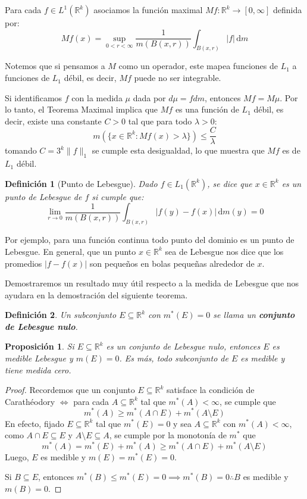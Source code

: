 \documentclass[12pt,a4paper]{article}
\theoremstyle{profesional}
\newtheorem{proposicion}{Proposición}[section]
\theoremstyle{definicion-style}
\newtheorem{definicion}{Definición}[section]
\newcommand{\R}{\mathbb{R}}
\begin{document}
Para cada \( f \in L^1(\R^k) \) asociamos la función maximal \( Mf: \R^k \to [0, \infty] \) definida por:\[
    Mf(x) = \sup_{0 < r < \infty} \frac{1}{m(B(x, r))} \int_{B(x, r)} |f| \, \mathrm{d} m
\]

Notemos que si pensamos a \( M \) como un operador, este mapea funciones de \( L_1 \) a funciones de \( L_1 \) débil, es decir, \( Mf \) puede no ser integrable.

Si identificamos \( f \) con la medida \( \mu \) dada por \( d \mu = f d m \), entonces \( Mf = M \mu \). Por lo tanto, el Teorema Maximal implica que \( Mf \) es una función
de \( L_1 \) débil, es decir, existe una constante \( C > 0 \) tal que para todo \( \lambda > 0 \):
\[
    m \left( \{ x \in \R^k : Mf(x) > \lambda \} \right) \leq \frac{C}{\lambda}
\]
tomando \( C = 3^k \|f\|_1 \) se cumple esta desigualdad, lo que muestra que \( Mf \) es de \( L_1 \) débil.

\begin{definicion}[Punto de Lebesgue]
    Dado \( f \in L_1(\R^k) \), se dice que \( x \in \R^k \) es un punto de Lebesgue de \( f \) si cumple que: \[
        \lim_{r \to 0} \frac{1}{m(B(x, r))} \int_{B(x, r)} |f(y) - f(x)| \, \mathrm{d} m(y) = 0
    \]
\end{definicion}

Por ejemplo, para una función continua todo punto del dominio es un punto de Lebesgue. En general, que un punto \( x \in \R^k \) sea de Lebesgue nos dice que los promedios
\( |f - f(x)| \) son pequeños en bolas pequeñas alrededor de \( x \).

Demostraremos un resultado muy útil respecto a la medida de Lebesgue que nos ayudara en la demostración del siguiente teorema.

\begin{definicion}
    Un subconjunto \( E \subseteq \R^k \) con \( m^*(E) = 0 \) se llama un \textbf{conjunto de Lebesgue nulo}.
\end{definicion}

\begin{proposicion}\label{proposicion:conjuntos-nulos}
    Si \( E \subseteq \R^k \) es un conjunto de Lebesgue nulo, entonces \( E \) es medible Lebesgue y \( m(E) = 0 \). Es más, todo subconjunto de \( E \) es medible y tiene medida cero.
\end{proposicion}
\begin{proof}
    Recordemos que un conjunto \( E \subseteq \R^k \) satisface la condición de Carathéodory \( \iff \) para cada \( A \subseteq \R^k \) tal que \( m^*(A) < \infty \), se cumple que \[
        m^*(A) \geq m^*(A \cap E) + m^*(A \setminus E)
    \]
    En efecto, fijado \( E \subseteq \R^k \) tal que \( m^*(E) = 0 \) y sea \( A \subseteq \R^k \) con \( m^*(A) < \infty \),
    como \( A \cap E \subseteq E \) y \( A \setminus E \subseteq A \), se cumple por la monotonía de \( m^* \) que \[
        m^*(A) = m^*(E) + m^*(A) \geq m^*(A \cap E) + m^*(A \setminus E)
    \]
    Luego, \( E \) es medible y \( m(E) = m^*(E) = 0 \).

    Si \( B \subseteq E \), entonces \( m^*(B) \leq m^*(E) = 0 \implies m^*(B) = 0 \therefore B \) es medible y \( m(B) = 0 \).
\end{proof}
\end{document}
